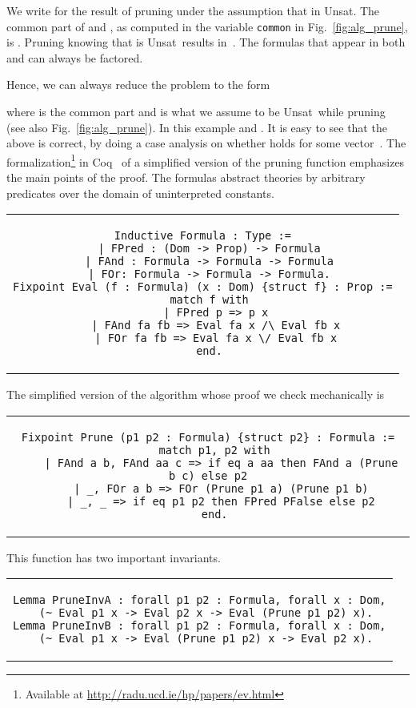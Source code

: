 \documentclass{llncs}
\def\lstinlinen{\lstinline[basicstyle=\normalsize\sffamily]}
\def\unsat{{\sc Unsat}}
\begin{document}
\noindent
We write  for the result of
pruning  under the assumption that  in \unsat.
The common part of  and , as computed in the
variable \lstinlinen|common| in Fig.~\ref{fig:alg_prune},
is . Pruning  knowing 
that  is \unsat\ results in~. 
The formulas that appear in both  and  
can always be factored.



\noindent
Hence, we can always reduce the problem to the form



\noindent
where  is the common part and  is what we
assume to be \unsat\ while pruning~ (see also Fig.~\ref{fig:alg_prune}). 
In this example  and 
.
It is easy to see that the above is correct, by doing a case
analysis on whether  holds for some vector~. 
The formalization\footnote{Available at
\url{http://radu.ucd.ie/hp/papers/ev.html}} in Coq~\cite{coq}
of a simplified version of the pruning function emphasizes
the main points of the proof. The formulas abstract theories
by arbitrary predicates over the domain of uninterpreted
constants.

\begin{tabular}{c}
\begin{lstlisting}
Inductive Formula : Type :=
  | FPred : (Dom -> Prop) -> Formula
  | FAnd : Formula -> Formula -> Formula
  | FOr: Formula -> Formula -> Formula.
Fixpoint Eval (f : Formula) (x : Dom) {struct f} : Prop :=
  match f with
    | FPred p => p x
    | FAnd fa fb => Eval fa x /\ Eval fb x
    | FOr fa fb => Eval fa x \/ Eval fb x
  end.
\end{lstlisting}
\end{tabular}

\noindent
The simplified version of the algorithm whose proof we check
mechanically is

\begin{tabular}{c}
\begin{lstlisting}
Fixpoint Prune (p1 p2 : Formula) {struct p2} : Formula :=
  match p1, p2 with
    | FAnd a b, FAnd aa c => if eq a aa then FAnd a (Prune b c) else p2
    | _, FOr a b => FOr (Prune p1 a) (Prune p1 b)
    | _, _ => if eq p1 p2 then FPred PFalse else p2
  end.
\end{lstlisting}
\end{tabular}

\noindent
This function has two important invariants.

\begin{tabular}{c}
\begin{lstlisting}
Lemma PruneInvA : forall p1 p2 : Formula, forall x : Dom,
  (~ Eval p1 x -> Eval p2 x -> Eval (Prune p1 p2) x).
Lemma PruneInvB : forall p1 p2 : Formula, forall x : Dom,
  (~ Eval p1 x -> Eval (Prune p1 p2) x -> Eval p2 x).
\end{lstlisting}
\end{tabular}
\end{document}
